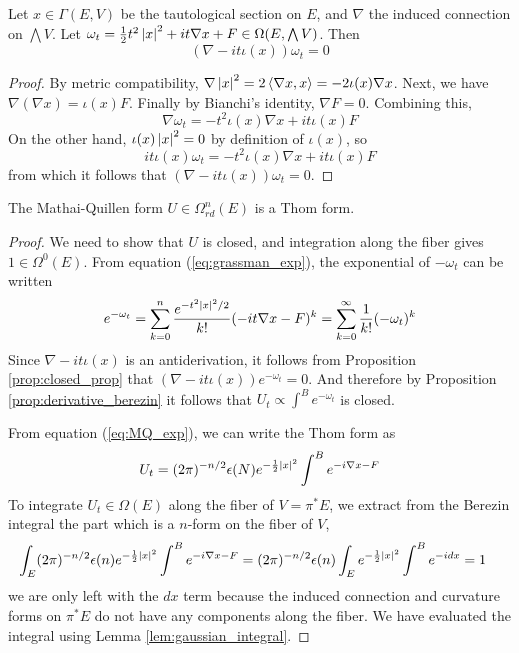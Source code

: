\begin{prop} \label{prop:closed_prop} %
	Let $x \in \Gamma(E,V)$ be the tautological section on $E$, and $\nabla$ the
	induced connection on $\bigwedge V$.
	Let $\omega_t = \frac{1}{2}t^2\abs{x}^2 + it\nabla x + F 
	\in \Omega(E,\bigwedge V)$. Then 
	\[
		(\nabla - it\iota(x))\omega_t = 0
	\] 
\end{prop}
\begin{proof}
	 By metric compatibility,
	$\nabla \abs{x}^2 = 2\gen{\nabla x, x} = -2\iota(x)\nabla x$.
	Next, we have $\nabla(\nabla x) = \iota(x) F$.
	Finally by Bianchi's identity, $\nabla F = 0$. Combining this,
	\[
	\nabla \omega_t = -t^2\iota(x) \nabla x + it\iota(x)F 
	\] 
	On the other hand, $\iota(x)\abs{x}^2 = 0$ by definition of $\iota(x)$, so
	\[
	it\iota(x)\omega_t = -t^2\iota(x) \nabla x + it\iota(x)F
	\] 
	from which it follows that $(\nabla - it\iota(x))\omega_t = 0$.
\end{proof}

\begin{thm}
	The Mathai-Quillen form $U \in \Omega^n_{rd}(E)$ is a Thom form. 
\end{thm}
\begin{proof}
	We need to show that $U$ is closed, and integration along the fiber gives $1\in
	\Omega^0(E)$.
	From equation (\ref{eq:grassman_exp}), the exponential of $-\omega_t$
	can be written 
	\begin{equation} \label{eq:MQ_exp}
		e^{-\omega_t} = \sum_{k=0}^{n} \frac{e^{-t^2\abs{x}^2 /2}}{k!} (-it\nabla x
		- F)^k 
		= \sum_{k=0}^{\infty} \frac{1}{k!} (-\omega_t)^k
	\end{equation}
	Since $\nabla - it\iota(x)$ is an antiderivation, it follows from
	Proposition \ref{prop:closed_prop} that $(\nabla-it\iota(x)) e^{-\omega_t} =
	0$. 
	And therefore by Proposition \ref{prop:derivative_berezin}
	it follows that $U_t \propto \int^B e^{-\omega_t}$ is closed.
	
	From equation (\ref{eq:MQ_exp}), we can write the Thom form as 
	\[
	U_t = (2\pi)^{-n/2}\epsilon(N) e^{-\frac{1}{2}\abs{x}^2}\int^B e^{-i\nabla x -F}
	\] 
	To integrate $U_t \in \Omega(E)$ along the fiber of $V=\pi^*E$, we extract from
	the Berezin integral the part which is a $n$-form on the fiber of $V$,
	\begin{align*}
		\int_E (2\pi)^{-n/2}\epsilon(n) e^{-\frac{1}{2}\abs{x}^2}\int^B e^{-i\nabla x -F}
		&= (2\pi)^{-n/2}\epsilon(n) \int_E e^{-\frac{1}{2}\abs{x}^2}\int^B 
		e^{-idx}
		= 1 
	\end{align*}
	we are only left with the $dx$ term because the induced connection and
	curvature forms on  $\pi^*E$ do not have any components along the fiber.
	We have evaluated the integral using Lemma \ref{lem:gaussian_integral}.
\end{proof}

